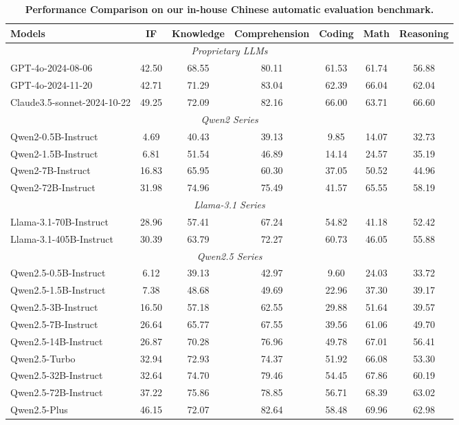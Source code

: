 \begin{table}[tbp]
\centering
\small
\caption{\textbf{Performance Comparison on our in-house Chinese automatic evaluation benchmark.} }
\label{tab:eval_v11_ZH}
\begin{tabular}{@{}lcccccc@{}}
\toprule
\textbf{Models} & \textbf{IF} & \textbf{Knowledge} & \textbf{Comprehension} & \textbf{Coding} & \textbf{Math} & \textbf{Reasoning} \\
\midrule
\multicolumn{7}{c}{\textit{Proprietary LLMs}} \\
\midrule
GPT-4o-2024-08-06 & 42.50 & 68.55 & 80.11 & 61.53 & 61.74 & 56.88 \\
GPT-4o-2024-11-20 & 42.71 & 71.29 & 83.04 & 62.39 & 66.04 & 62.04 \\
Claude3.5-sonnet-2024-10-22 & 49.25 & 72.09 & 82.16 & 66.00 & 63.71 & 66.60\\
\midrule
\multicolumn{7}{c}{\textit{Qwen2 Series}} \\
\midrule
Qwen2-0.5B-Instruct & 4.69 & 40.43 & 39.13 & 9.85 & 14.07 & 32.73 \\
Qwen2-1.5B-Instruct & 6.81 & 51.54 & 46.89 & 14.14 & 24.57 & 35.19 \\
Qwen2-7B-Instruct & 16.83 & 65.95 & 60.30 & 37.05 & 50.52 & 44.96 \\
Qwen2-72B-Instruct & 31.98 & 74.96 & 75.49 & 41.57 & 65.55 & 58.19 \\
\midrule
\multicolumn{7}{c}{\textit{Llama-3.1 Series}} \\
\midrule
Llama-3.1-70B-Instruct & 28.96 & 57.41 & 67.24 & 54.82 & 41.18 & 52.42 \\
Llama-3.1-405B-Instruct & 30.39 & 63.79 & 72.27 & 60.73 & 46.05 & 55.88\\
\midrule
\multicolumn{7}{c}{\textit{Qwen2.5 Series}} \\
\midrule
Qwen2.5-0.5B-Instruct & 6.12 & 39.13 & 42.97 & 9.60 & 24.03 & 33.72 \\
Qwen2.5-1.5B-Instruct & 7.38 & 48.68 & 49.69 & 22.96 & 37.30 & 39.17 \\
Qwen2.5-3B-Instruct & 16.50 & 57.18 & 62.55 & 29.88 & 51.64 & 39.57 \\
Qwen2.5-7B-Instruct & 26.64 & 65.77 & 67.55 & 39.56 & 61.06 & 49.70 \\
Qwen2.5-14B-Instruct & 26.87 & 70.28 & 76.96 & 49.78 & 67.01 & 56.41 \\
Qwen2.5-Turbo        & 32.94 & 72.93 & 74.37 & 51.92 & 66.08 & 53.30 \\
Qwen2.5-32B-Instruct & 32.64 & 74.70 & 79.46 & 54.45 & 67.86 & 60.19 \\
Qwen2.5-72B-Instruct & 37.22 & 75.86 & 78.85 & 56.71 & 68.39 & 63.02 \\
Qwen2.5-Plus         & 46.15 & 72.07 & 82.64 & 58.48 & 69.96 & 62.98 \\
\bottomrule
\end{tabular}
\end{table}

